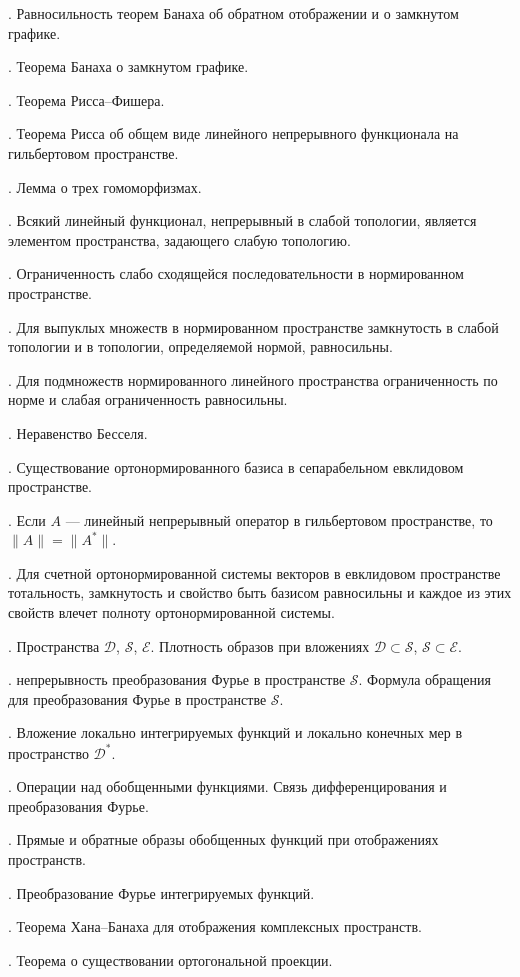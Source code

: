 \documentclass[10pt]{article}
\begin{document}
. Равносильность теорем Банаха об обратном отображении и
о замкнутом графике.

. Теорема Банаха о замкнутом графике.

. Теорема Рисса--Фишера.

. Теорема Рисса об общем виде линейного непрерывного
функционала на гильбертовом пространстве.

. Лемма о трех гомоморфизмах.

. Всякий линейный функционал, непрерывный в слабой
топологии, является элементом пространства, задающего слабую
топологию.

. Ограниченность слабо сходящейся последовательности в
нормированном пространстве.

. Для выпуклых множеств в нормированном пространстве
замкнутость в слабой топологии и в топологии, определяемой нормой,
равносильны.

. Для подмножеств нормированного линейного пространства
ограниченность по норме и слабая ограниченность равносильны.

. Неравенство Бесселя.

. Существование ортонормированного базиса в
сепарабельном евклидовом пространстве.

. Если $A$ --- линейный непрерывный оператор в
гильбертовом пространстве, то $\|A\|=\|A^*\|$.

. Для счетной ортонормированной системы векторов в
евклидовом пространстве тотальность, замкнутость и свойство быть
базисом равносильны и каждое из этих свойств влечет полноту
ортонормированной системы.

. Пространства $\mathcal{D}$, $\mathcal{S}$,
$\mathcal{E}$. Плотность образов при вложениях $\mathcal{D}\subset
\mathcal{S}$, $\mathcal{S}\subset\mathcal{E}$.

. непрерывность преобразования Фурье в пространстве
$\mathcal{S}$. Формула обращения для преобразования Фурье в
пространстве $\mathcal{S}$.

. Вложение локально интегрируемых функций и локально
конечных мер в пространство $\mathcal{D}^*$.

. Операции над обобщенными функциями. Связь
дифференцирования и преобразования Фурье.

. Прямые и обратные образы обобщенных функций при
отображениях пространств.

. Преобразование Фурье интегрируемых функций.

. Теорема Хана--Банаха для отображения комплексных
пространств.

. Теорема о существовании ортогональной проекции.
\end{document}
